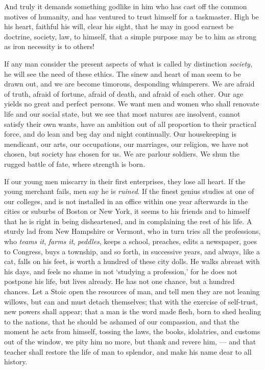 \documentclass{article}
\begin{document}
And truly it demands something godlike in him who has cast off the common
motives of humanity, and has ventured to trust himself for a taskmaster.
High be his heart, faithful his will, clear his sight, that he may in good
earnest be doctrine, society, law, to himself, that a simple purpose may be
to him as strong as iron necessity is to others!

If any man consider the present aspects of what is called by distinction
{\it society}, he will see the need of these ethics. The sinew and heart of man
seem to be drawn out, and we are become timorous, desponding whimperers. We
are afraid of truth, afraid of fortune, afraid of death, and afraid of each
other. Our age yields no great and perfect persons. We want men and women
who shall renovate life and our social state, but we see that most natures
are insolvent, cannot satisfy their own wants, have an ambition out of all
proportion to their practical force, and do lean and beg day and night
continually. Our housekeeping is mendicant, our arts, our occupations, our
marriages, our religion, we have not chosen, but society has chosen for us.
We are parlour soldiers. We shun the rugged battle of fate, where strength
is born.

If our young men miscarry in their first enterprises, they lose all heart.
If the young merchant fails, men say he is {\it ruined}. If the finest genius
studies at one of our colleges, and is not installed in an office within one
year afterwards in the cities or suburbs of Boston or New York, it seems to
his friends and to himself that he is right in being disheartened, and in
complaining the rest of his life. A sturdy lad from New Hampshire or
Vermont, who in turn tries all the professions, who {\it teams it},
{\it farms it}, {\it peddles}, keeps a school, preaches,
edits a newspaper, goes to Congress,
buys a township, and so forth, in successive years, and always, like a cat,
falls on his feet, is worth a hundred of these city dolls. He walks abreast
with his days, and feels no shame in not `studying a profession,' for he
does not postpone his life, but lives already. He has not one chance, but a
hundred chances. Let a Stoic open the resources of man, and tell men they
are not leaning willows, but can and must detach themselves; that with the
exercise of self-trust, new powers shall appear; that a man is the word made
flesh, born to shed healing to the nations, that he should be ashamed of our
compassion, and that the moment he acts from himself, tossing the laws, the
books, idolatries, and customs out of the window, we pity him no more, but
thank and revere him, --- and that teacher shall restore the life of man to
splendor, and make his name dear to all history.
\end{document}
